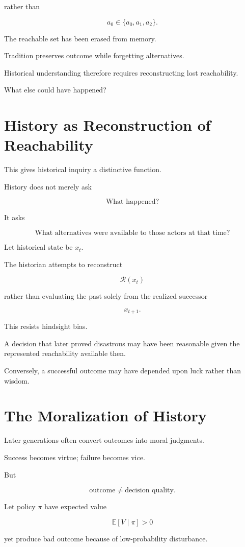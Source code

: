 \documentclass[11pt,oneside]{book}
\theoremstyle{definition}
\theoremstyle{remark}
\newcommand{\R}{\mathcal{R}}
\begin{document}
rather than

\[
a_0\in\{a_0,a_1,a_2\}.
\]

The reachable set has been erased from memory.

Tradition preserves outcome while forgetting alternatives.

Historical understanding therefore requires reconstructing lost reachability.

What else could have happened?

\section{History as Reconstruction of Reachability}

This gives historical inquiry a distinctive function.

History does not merely ask

\[
\text{What happened?}
\]

It asks

\[
\text{What alternatives were available to those actors at that time?}
\]

Let historical state be \(x_t\).

The historian attempts to reconstruct

\[
\R(x_t)
\]

rather than evaluating the past solely from the realized successor

\[
x_{t+1}.
\]

This resists hindsight bias.

A decision that later proved disastrous may have been reasonable given the represented reachability available then.

Conversely, a successful outcome may have depended upon luck rather than wisdom.

\section{The Moralization of History}

Later generations often convert outcomes into moral judgments.

Success becomes virtue; failure becomes vice.

But

\[
\text{outcome}
\neq
\text{decision quality}.
\]

Let policy \(\pi\) have expected value

\[
\mathbb E[V\mid\pi]>0
\]

yet produce bad outcome because of low-probability disturbance.
\end{document}
